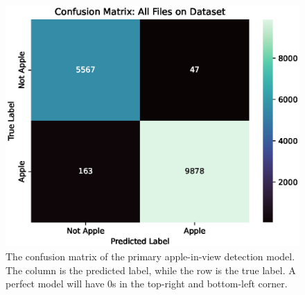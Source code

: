 \begin{figure}[!htb]
    \centering
    \includegraphics[width=\columnwidth,keepaspectratio]
    {./figures/confusion_matrix_All_Files_on_Dataset}
    \caption{
        The confusion matrix of the primary apple-in-view detection model.
        The column is the predicted label, while the row is the true label.
        A perfect model will have 0s in the top-right and bottom-left corner.
    }
    \label{fig:apple-in-view-confusion-matrix}
\end{figure}



